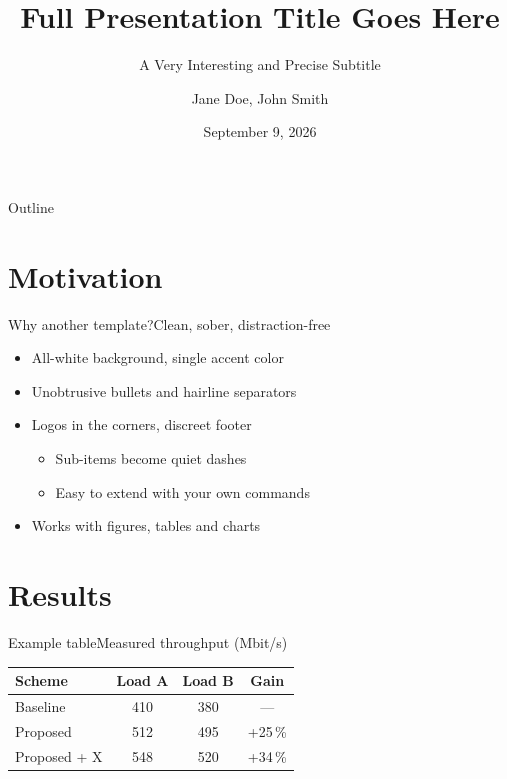 \documentclass[aspectratio=169,10pt]{beamer}
\title[Short Title]{Full Presentation Title Goes Here}
\subtitle[Short Subtitle]{A Very Interesting and Precise Subtitle}
\author[Doe \& Smith]{Jane Doe, John Smith}
\date[09.09.2026]{September 9, 2026}
\begin{document}
\begin{frame}[plain]
  \titlepage
\end{frame}

\begin{frame}{Outline}
  \tableofcontents[hideallsubsections]
\end{frame}

\section{Motivation}
\begin{frame}{Why another template?}{Clean, sober, distraction-free}
  \begin{itemize}
    \item All-white background, single accent color
    \item Unobtrusive bullets and hairline separators
    \item Logos in the corners, discreet footer
      \begin{itemize}
        \item Sub-items become quiet dashes
        \item Easy to extend with your own commands
      \end{itemize}
    \item Works with figures, tables and charts
  \end{itemize}
\end{frame}

\section{Results}
\begin{frame}{Example table}{Measured throughput (Mbit/s)}
  \begin{table}
    \centering
    \begin{tabular}{lccc}
      \toprule
      \textcolor{accenthesso}{\textbf{Scheme}} &
      \textcolor{accenthesso}{\textbf{Load A}} &
      \textcolor{accenthesso}{\textbf{Load B}} &
      \textcolor{accenthesso}{\textbf{Gain}} \\
      \midrule
      Baseline      & 410 & 380 & --- \\
      Proposed      & 512 & 495 & +25\,\% \\
      Proposed + X  & 548 & 520 & +34\,\% \\
      \bottomrule
    \end{tabular}
  \end{table}
\end{frame}
\end{document}
